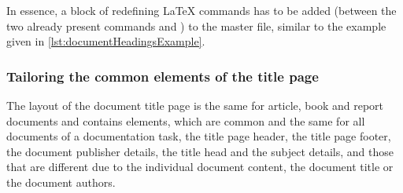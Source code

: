 In essence, a block of redefining \LaTeX{} commands has to be added
(between the two already present commands \latexcmd{\makeatletter} and
\latexcmd{\makeatother}) to the master file, similar to the example given
in \autoref{lst:documentHeadingsExample}.
%
\begin{CommandLineListing}[style=DefaultFileListing, print=true, xleftmargin=0pt, gobble=2, %
  caption={Definition of document headings in the masterfile}, %
  label=lst:documentHeadingsExample]
  \makeatletter

  \renewcommand*{\ThisDocType}{%
    tr%
  }
  \renewcommand*{\ThisDocExtNum}{%
    03%
  }
  \renewcommand*{\ThisDocIntNum}{%
    37%
  }
  \renewcommand*{\ThisDocIssue}{%
    1%
  }
  \renewcommand*{\ThisDocRevision}{%
    3%
  }
  \renewcommand*{\subtitlePrefix}{%
  }
  \renewcommand*{\ThisDocSubtitle}{%
    WLG Quickstart Guide%
  }
  \renewcommand*{\ThisDocHeaderTitleSubstr}{%
    \wegcLaTeX{}%
  }
  \renewcommand*{\ThisDocIdSubstr}{%
    \aces{wegc}-WLG-QSG%
  }
  \renewcommand*{\ThisDocDate}{%
    \displaydate{ThisDocDate}%
  }
  \renewcommand*{\ThisDocYear}{%
    2028%
  }

  \makeatother
\end{CommandLineListing}



\begin{landscape}

\end{landscape}


\subsubsection[Title page common elements]{Tailoring the common elements of the title page}
\label{subsubsec:multiDocumentTitlePageCommons}

The layout of the document title page is the same for article, book and
report documents and contains elements, which are common and the same for
all documents of a documentation task, \IE{} the title page header, the
title page footer, the document publisher details, the title head and the
subject details, and those that are different due to the individual
document content, \EG{} the document title or the document authors.


